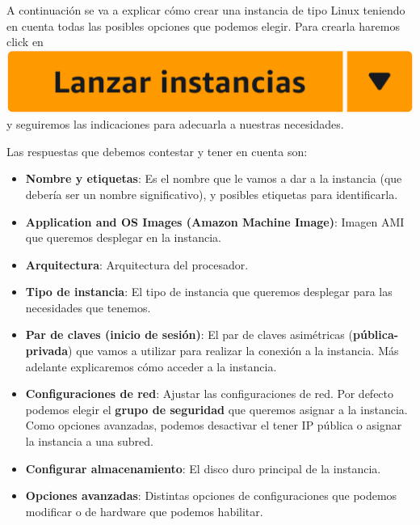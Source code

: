 A continuación se va a explicar cómo crear una instancia de tipo Linux teniendo en cuenta todas las posibles opciones que podemos elegir. Para crearla haremos click en \includegraphics[height=0.8\baselineskip]{img/aws/ec2_instance_create.png} y seguiremos las indicaciones para adecuarla a nuestras necesidades.

Las respuestas que debemos contestar y tener en cuenta son:

\begin{itemize}
	\item \textbf{Nombre y etiquetas}: Es el nombre que le vamos a dar a la instancia (que debería ser un nombre significativo), y posibles etiquetas para identificarla.
	
	\item \textbf{Application and OS Images (Amazon Machine Image)}: Imagen AMI que queremos desplegar en la instancia.
	
	\item \textbf{Arquitectura}: Arquitectura del procesador.
	
	\item \textbf{Tipo de instancia}: El tipo de instancia que queremos desplegar para las necesidades que tenemos.
	
	\item \textbf{Par de claves (inicio de sesión)}: El par de claves asimétricas (\textbf{pública-privada}) que vamos a utilizar para realizar la conexión a la instancia. Más adelante explicaremos cómo acceder a la instancia. 
	
	
	\item \textbf{Configuraciones de red}: Ajustar las configuraciones de red. Por defecto podemos elegir el \textbf{grupo de seguridad} que queremos asignar a la instancia. Como opciones avanzadas, podemos desactivar el tener IP pública o asignar la instancia a una subred.

	
	\item \textbf{Configurar almacenamiento}: El disco duro principal de la instancia.
	
	\item \textbf{Opciones avanzadas}: Distintas opciones de configuraciones que podemos modificar o de hardware que podemos habilitar.
\end{itemize}

